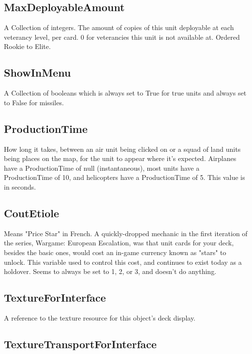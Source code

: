 \documentclass{article}
\begin{document}
\subsection{MaxDeployableAmount}

A Collection of integers. The amount of copies of this unit deployable at each veterancy level, per card. 0 for veterancies this unit is not available at. Ordered Rookie to Elite.

\subsection{ShowInMenu}

A Collection of booleans which is always set to True for true units and always set to False for missiles.

\subsection{ProductionTime}

How long it takes, between an air unit being clicked on or a squad of land units being places on the map, for the unit to appear where it's expected. Airplanes have a ProductionTime of null (instantaneous), most units have a ProductionTime of 10, and helicopters have a ProductionTime of 5. This value is in seconds.

\subsection{CoutEtiole}

Means "Price Star" in French. A quickly-dropped mechanic in the first iteration of the series, Wargame: European Escalation, was that unit cards for your deck, besides the basic ones, would cost an in-game currency known as "stars" to unlock. This variable used to control this cost, and continues to exist today as a holdover. Seems to always be set to 1, 2, or 3, and doesn't do anything.

\subsection{TextureForInterface}

A reference to the texture resource for this object's deck display.

\subsection{TextureTransportForInterface}
\end{document}
